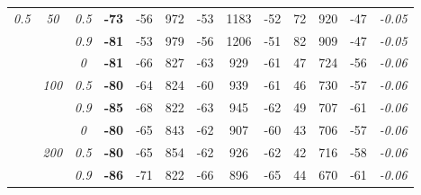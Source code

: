 \begin{table}
\begin{center}
\begin{tabular}{ccc|cc|cc|cc|cc|c|c}
\it  0.5  & \it  50  & \it  0.5  & {\bf -73} & -56 & 972 & -53 & 1183 & -52 & 72 & 920 & -47 & \it  -0.05 \\
& & \it  0.9  & {\bf -81} & -53 & 979 & -56 & 1206 & -51 & 82 & 909 & -47 & \it  -0.05 \\[1ex]
\cline{2-3}\rule{0pt}{3ex}
& & \it  0  & {\bf -81} & -66 & 827 & -63 & 929 & -61 & 47 & 724 & -56 & \it  -0.06 \\
 & \it  100  & \it  0.5  & {\bf -80} & -64 & 824 & -60 & 939 & -61 & 46 & 730 & -57 & \it  -0.06 \\
& & \it  0.9  & {\bf -85} & -68 & 822 & -63 & 945 & -62 & 49 & 707 & -61 & \it  -0.06 \\[1ex]
\cline{2-3}\rule{0pt}{3ex}
& & \it  0  & {\bf -80} & -65 & 843 & -62 & 907 & -60 & 43 & 706 & -57 & \it  -0.06 \\
 & \it  200  & \it  0.5  & {\bf -80} & -65 & 854 & -62 & 926 & -62 & 42 & 716 & -58 & \it  -0.06 \\
& & \it  0.9  & {\bf -86} & -71 & 822 & -66 & 896 & -65 & 44 & 670 & -61 & \it  -0.06 \\
\hline\end{tabular}
\end{center}
\end{table}




